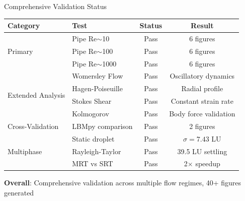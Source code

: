 \documentclass[aspectratio=169]{beamer}
\begin{document}
\begin{frame}{Comprehensive Validation Status}
\begin{table}
\centering
\small
\begin{tabular}{llcc}
\toprule
\textbf{Category} & \textbf{Test} & \textbf{Status} & \textbf{Result} \\
\midrule
\multirow{3}{*}{Primary} & Pipe Re$\sim$10 & Pass & 6 figures \\
& Pipe Re$\sim$100 & Pass & 6 figures \\
& Pipe Re$\sim$1000 & Pass & 6 figures \\
\midrule
\multirow{4}{*}{Extended Analysis} & Womersley Flow & Pass & Oscillatory dynamics \\
& Hagen-Poiseuille & Pass & Radial profile \\
& Stokes Shear & Pass & Constant strain rate \\
& Kolmogorov & Pass & Body force validation \\
\midrule
Cross-Validation & LBMpy comparison & Pass & 2 figures \\
\midrule
\multirow{3}{*}{Multiphase} & Static droplet & Pass & $\sigma = 7.43$ LU \\
& Rayleigh-Taylor & Pass & 39.5 LU settling \\
& MRT vs SRT & Pass & 2$\times$ speedup \\
\bottomrule
\end{tabular}
\end{table}

\vspace{0.2cm}
\textbf{Overall}: Comprehensive validation across multiple flow regimes, 40+ figures generated
\end{frame}
\end{document}
